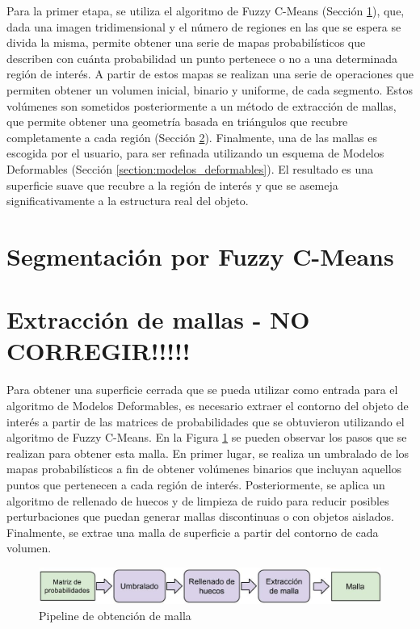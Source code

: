 Para la primer etapa, se utiliza el algoritmo de Fuzzy C-Means (Sección \ref{section:segmentacion_fuzzy}), que, dada una imagen tridimensional y el número de regiones en las que se espera se divida la misma, permite obtener una serie de mapas probabilísticos que describen con cuánta probabilidad un punto pertenece o no a una determinada región de interés. A partir de estos mapas se realizan una serie de operaciones que permiten obtener un volumen inicial, binario y uniforme, de cada segmento. Estos volúmenes son sometidos posteriormente a un método de extracción de mallas, que permite obtener una geometría basada en triángulos que recubre completamente a cada región (Sección \ref{section:extraccion_de_mallas}). Finalmente, una de las mallas es escogida por el usuario, para ser refinada utilizando un esquema de Modelos Deformables (Sección \ref{section:modelos_deformables}). El resultado es una superficie suave que recubre a la región de interés y que se asemeja significativamente a la estructura real del objeto.

\section{Segmentación por Fuzzy C-Means}\label{section:segmentacion_fuzzy}

\section{Extracción de mallas - NO CORREGIR!!!!!}\label{section:extraccion_de_mallas}
Para obtener una superficie cerrada que se pueda utilizar como entrada para el algoritmo de Modelos Deformables, es necesario extraer el contorno del objeto de interés a partir de las matrices de probabilidades que se obtuvieron utilizando el algoritmo de Fuzzy C-Means. En la Figura \ref{fig:pipe_obtencion_malla} se pueden observar los pasos que se realizan para obtener esta malla. En primer lugar, se realiza un umbralado de los mapas probabilísticos a fin de obtener volúmenes binarios que incluyan aquellos puntos que pertenecen a cada región de interés. Posteriormente, se aplica un algoritmo de rellenado de huecos y de limpieza de ruido para reducir posibles perturbaciones que puedan generar mallas discontinuas o con objetos aislados. Finalmente, se extrae una malla de superficie a partir del contorno de cada volumen.

\begin{figure}[H]
	\centering
	\includegraphics[scale=0.3]{images/pipeline_de_obtencion_de_malla.jpg}
	\caption{Pipeline de obtención de malla}
	\label{fig:pipe_obtencion_malla}
\end{figure}

